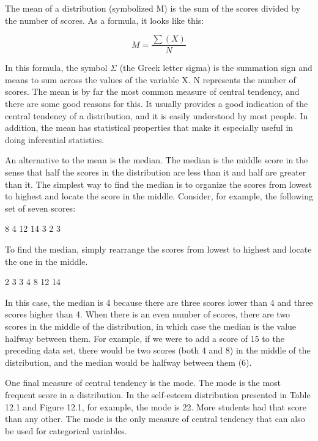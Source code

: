 The mean of a distribution (symbolized M) is the sum of the scores divided by the number of scores. As a formula, it looks like this:


\begin{equation}
M = \frac{\sum(X)}{N}
\end{equation}

In this formula, the symbol $Σ$ (the Greek letter sigma) is the summation sign and means to sum across the
values of the variable X. N represents the number of scores. The mean is by far the most common measure of central tendency, and there are some good reasons for this. It usually provides a good indication of the central tendency of a distribution, and it is easily understood by most people. In addition, the mean has statistical properties that make it especially useful in doing inferential statistics.


An alternative to the mean is the median. The median is the middle score in the sense that half the scores in the distribution are less than it and half are greater than it. The simplest way to find the median is to organize the scores from lowest to highest and locate the score in the middle. Consider, for example, the following set of seven scores:


\begin{kframe}
8 4 12 14 3 2 3

\end{kframe}

To find the median, simply rearrange the scores from lowest to highest and locate the one in the middle.


\begin{kframe}
2 3 3 4 8 12 14

\end{kframe}

In this case, the median is 4 because there are three scores lower than 4 and three scores higher than 4. When
there is an even number of scores, there are two scores in the middle of the distribution, in which case the median is the value halfway between them. For example, if we were to add a score of 15 to the preceding data set, there would be two scores (both 4 and 8) in the middle of the distribution, and the median would be halfway between them (6).


One final measure of central tendency is the mode. The mode is the most frequent score in a distribution. In the self-esteem distribution presented in Table 12.1 and Figure 12.1, for example, the mode is 22. More students had that score than any other. The mode is the only measure of central tendency that can also be used for categorical variables.


